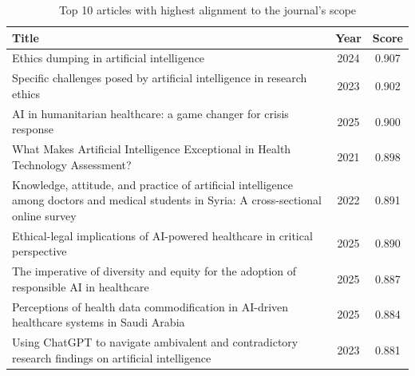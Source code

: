 \documentclass[pdflatex,sn-mathphys-num]{sn-jnl}%
\theoremstyle{thmstyleone}%
\theoremstyle{thmstyletwo}%
\theoremstyle{thmstylethree}%
\begin{document}
\begin{table}[h]
\centering
\begin{tabular}{p{10cm} c c}
\hline
\textbf{Title} & \textbf{Year} & \textbf{Score} \\
\hline
Ethics dumping in artificial intelligence & 2024 & 0.907 \\
\hline
Specific challenges posed by artificial intelligence in research ethics & 2023 & 0.902 \\
\hline
AI in humanitarian healthcare: a game changer for crisis response & 2025 & 0.900 \\
\hline
What Makes Artificial Intelligence Exceptional in Health Technology Assessment? & 2021 & 0.898 \\
\hline
Knowledge, attitude, and practice of artificial intelligence among doctors and medical students in Syria: A cross-sectional online survey & 2022 & 0.891 \\
\hline
Ethical-legal implications of AI-powered healthcare in critical perspective & 2025 & 0.890 \\
\hline
The imperative of diversity and equity for the adoption of responsible AI in healthcare & 2025 & 0.887 \\
\hline
Perceptions of health data commodification in AI-driven healthcare systems in Saudi Arabia & 2025 & 0.884 \\
\hline
Using ChatGPT to navigate ambivalent and contradictory research findings on artificial intelligence & 2023 & 0.881 \\
\hline
\end{tabular}
\caption{Top 10 articles with highest alignment to the journal's scope}
\end{table}




\end{document}
